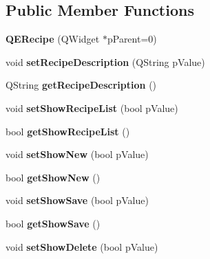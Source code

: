 \subsection*{Public Member Functions}
\begin{DoxyCompactItemize}
\item 
\hypertarget{classQERecipe_a3cf11d0f6766854ed10958a52bd306ac}{
{\bfseries QERecipe} (QWidget $\ast$pParent=0)}
\label{classQERecipe_a3cf11d0f6766854ed10958a52bd306ac}

\item 
\hypertarget{classQERecipe_a1b3e11069512af718c2e27bedc6f5142}{
void {\bfseries setRecipeDescription} (QString pValue)}
\label{classQERecipe_a1b3e11069512af718c2e27bedc6f5142}

\item 
\hypertarget{classQERecipe_a2afbe57d1559cc608c44ebf9aaee01c4}{
QString {\bfseries getRecipeDescription} ()}
\label{classQERecipe_a2afbe57d1559cc608c44ebf9aaee01c4}

\item 
\hypertarget{classQERecipe_ae7114c0f04650b35841eec58f442a7f0}{
void {\bfseries setShowRecipeList} (bool pValue)}
\label{classQERecipe_ae7114c0f04650b35841eec58f442a7f0}

\item 
\hypertarget{classQERecipe_a6a4ee087fffea570978996978e147bcc}{
bool {\bfseries getShowRecipeList} ()}
\label{classQERecipe_a6a4ee087fffea570978996978e147bcc}

\item 
\hypertarget{classQERecipe_a1d08e945b4ead95d05ab7180499d7f9c}{
void {\bfseries setShowNew} (bool pValue)}
\label{classQERecipe_a1d08e945b4ead95d05ab7180499d7f9c}

\item 
\hypertarget{classQERecipe_a414aaf31062801748c28dba69d14f132}{
bool {\bfseries getShowNew} ()}
\label{classQERecipe_a414aaf31062801748c28dba69d14f132}

\item 
\hypertarget{classQERecipe_a4f768bf168906ea61f04c896f76e15e3}{
void {\bfseries setShowSave} (bool pValue)}
\label{classQERecipe_a4f768bf168906ea61f04c896f76e15e3}

\item 
\hypertarget{classQERecipe_ab380b7fe6b6c7bbe66f0d2dd85dc9cf3}{
bool {\bfseries getShowSave} ()}
\label{classQERecipe_ab380b7fe6b6c7bbe66f0d2dd85dc9cf3}

\item 
\hypertarget{classQERecipe_a658eb9b8e84965cdf63cb5c8576925aa}{
void {\bfseries setShowDelete} (bool pValue)}
\label{classQERecipe_a658eb9b8e84965cdf63cb5c8576925aa}


\end{DoxyCompactItemize}
